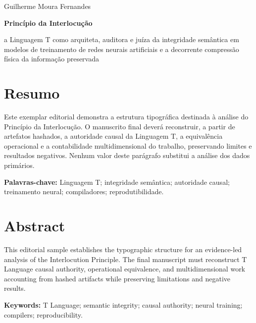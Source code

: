 \begin{titlepage}
  \centering
  \vspace*{18mm}
  {\Large\sffamily\color{CasuloTeal} Guilherme Moura Fernandes\par}
  \vfill
  {\Huge\sffamily\bfseries\color{CasuloNavy}
    Princípio da Interlocução\par}
  \vspace{8mm}
  {\LARGE\sffamily
    a Linguagem T como arquiteta, auditora e juíza da integridade semântica em
    modelos de treinamento de redes neurais artificiais e a decorrente
    compressão física da informação preservada\par}
  \vfill
  {\large{}\par}
\end{titlepage}

\cleardoublepage
\chapter*{Resumo}
Este exemplar editorial demonstra a estrutura tipográfica destinada à análise
do Princípio da Interlocução. O manuscrito final deverá reconstruir, a partir de
artefatos hashados, a autoridade causal da Linguagem T, a equivalência
operacional e a contabilidade multidimensional do trabalho, preservando limites
e resultados negativos. Nenhum valor deste parágrafo substitui a análise dos
dados primários.

\noindent\textbf{Palavras-chave:} Linguagem T; integridade semântica; autoridade
causal; treinamento neural; compiladores; reprodutibilidade.

\chapter*{Abstract}
This editorial sample establishes the typographic structure for an evidence-led
analysis of the Interlocution Principle. The final manuscript must reconstruct
T Language causal authority, operational equivalence, and multidimensional work
accounting from hashed artifacts while preserving limitations and negative
results.

\noindent\textbf{Keywords:} T Language; semantic integrity; causal authority;
neural training; compilers; reproducibility.

\tableofcontents
\listoffigures
\listoftables
